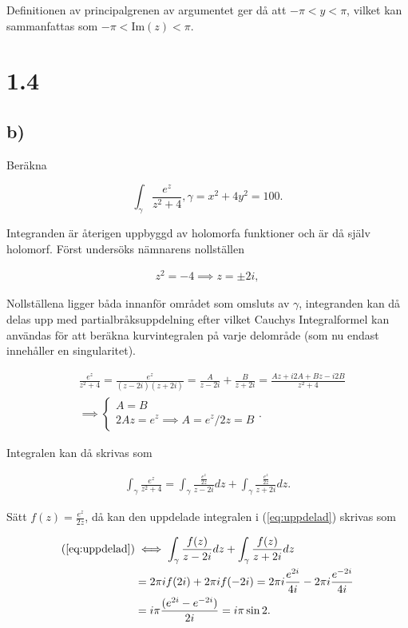 \documentclass[a4paper]{article}
\begin{document}
Definitionen av principalgrenen av argumentet ger då att $-\pi < y < \pi$, vilket kan sammanfattas som $-\pi < \text{Im}(z) < \pi$.

\section*{1.4}
\subsection*{b)}

Beräkna

\begin{equation*}
	\int_\gamma \frac{e^z}{z^2 + 4}, \gamma = x^2 + 4y^2 = 100.
\end{equation*}

Integranden är återigen uppbyggd av holomorfa funktioner och är då själv holomorf. Först undersöks nämnarens nollställen

\begin{align*}
	z^2 = -4 \implies z = \pm 2i,
\end{align*}

Nollställena ligger båda innanför området som omsluts av $\gamma$, integranden kan då delas upp med partialbråksuppdelning efter vilket Cauchys Integralformel kan användas för att beräkna kurvintegralen på varje delområde (som nu endast innehåller en singularitet).

\begin{align*}
	&\frac{e^z}{z^2 + 4} = \frac{e^z}{(z-2i)(z+2i)} = \frac{A}{z-2i} + \frac{B}{z+2i} = \frac{Az + i2A + Bz - i2B}{z^2 + 4}\\
	&\implies	\begin{cases}
					A = B\\
					2Az = e^z \implies A = e^z/2z = B
				\end{cases}.
\end{align*}

Integralen kan då skrivas som

\begin{align}
	\int_\gamma \frac{e^z}{z^2 + 4} = \int_\gamma \frac{\frac{e^z}{2z}}{z-2i}dz + \int_\gamma \frac{\frac{e^z}{2z}}{z+2i}dz.\label{eq:uppdelad}
\end{align}

Sätt $f(z) = \frac{e^z}{2z}$, då kan den uppdelade integralen i (\ref{eq:uppdelad}) skrivas som

\begin{align*}
	(\ref{eq:uppdelad}) &\iff \int_\gamma \frac{f(z)}{z-2i}dz + \int_\gamma \frac{f(z)}{z+2i}dz\\
		&= 2\pi i f(2i) + 2\pi i f(-2i) = 2\pi i \frac{e^{2i}}{4i} - 2\pi i \frac{e^{-2i}}{4i}\\
		&= i\pi\frac{(e^{2i} - e^{-2i})}{2i} = i\pi\sin 2.
\end{align*}
\end{document}
